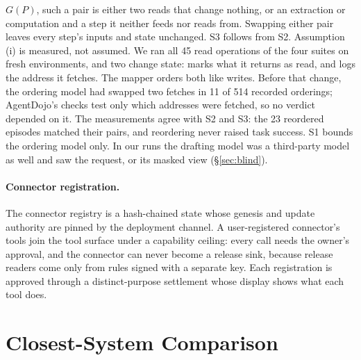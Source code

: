 \documentclass[letterpaper,twocolumn,10pt]{article}
\newcommand{\code}[1]{\texttt{\detokenize{#1}}}
\begin{document}
$G(P)$, such a pair is either two reads that change nothing, or an
extraction or computation and a step it neither feeds nor reads from.
Swapping either pair leaves every step's inputs and state unchanged.
S3 follows from S2.
Assumption (i) is measured, not assumed. We ran all 45 read operations of
the four suites on fresh environments, and two change state:
\code{get_unread_emails} marks what it returns as read, and
\code{get_webpage} logs the address it fetches. The mapper orders both
like writes. Before that change, the ordering model had swapped two
fetches in 11 of 514 recorded orderings; AgentDojo's checks test only
which addresses were fetched, so no verdict depended on it.
The measurements agree with S2 and S3: the 23 reordered episodes matched
their pairs, and reordering never raised task success. S1 bounds the
ordering model only. In our runs the drafting model was a third-party
model as well and saw the request, or its masked view (\S\ref{sec:blind}).

\paragraph{Connector registration.} The connector registry is a
hash-chained state whose genesis and update authority are pinned by the
deployment channel. A user-registered connector's tools join the tool
surface under a capability ceiling: every call needs the owner's
approval, and the connector can never become a release sink, because
release readers come only from rules signed with a separate key. Each
registration is approved through a distinct-purpose settlement whose
display shows what each tool does.

\section{Closest-System Comparison}
\label{app:related-comparison}
\end{document}
